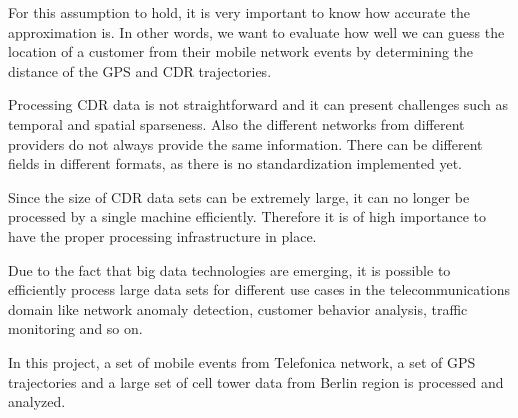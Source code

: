 For this assumption to hold, it is very important to know how accurate the approximation is. In other words, we want to evaluate how well we can guess the location of a customer from their mobile network events by determining the distance of the GPS and CDR trajectories.

Processing CDR data is not straightforward and it can present challenges such as temporal and spatial sparseness. Also the different networks from different providers do not always provide the same information. There can be different fields in different formats, as there is no standardization implemented yet. 

Since the size of CDR data sets can be extremely large, it can no longer be processed by a single machine efficiently. Therefore it is of high importance to have the proper processing infrastructure in place.  

Due to the fact that big data technologies are emerging, it is possible to efficiently process large data sets for different use cases in the telecommunications domain like network anomaly detection, customer behavior analysis, traffic monitoring and so on.

In this project, a set of mobile events from Telefonica network, a set of GPS trajectories and a large set of cell tower data from Berlin region is processed and analyzed. 


